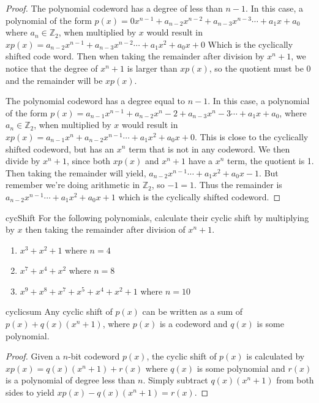 \begin{proof}{}

The polynomial codeword has a degree of less than $n-1$. In this case, a polynomial of the form $p(x)= 0x^{n-1} + a_{n-2}x^{n-2} + a_{n-3}x^{n-3} \cdots + a_{1}x + a_0$ where $a_n \in \mathbb{Z}_2$, when multiplied by $x$ would result in $xp(x)=a_{n-2}x^{n-1} + a_{n-3}x^{n-2} \cdots + a_1x^2 + a_{0}x + 0$ Which is the cyclically shifted code word.  Then when taking the remainder after division by $x^n + 1$, we notice that the degree of $x^n + 1$ is larger than $xp(x)$, so the quotient must be 0 and the remainder will be $xp(x)$.

 
The polynomial codeword has a degree equal to $n-1$.  In this case, a polynomial of the form $p(x)= a_{n-1}x^{n-1} + a_{n-2}x^n-2 + a_{n-3}x^n-3 \cdots + a_{1}x + a_0$, where $a_n \in \mathbb{Z}_2$, when multiplied by $x$ would result in $xp(x)=a_{n-1}x^n + a_{n-2}x^{n-1} \cdots + a_1x^2 + a_{0}x + 0$.  This is close to the cyclically shifted codeword, but has an $x^n$ term that is not in any codeword.  We then divide by $x^n + 1$, since both $xp(x)$ and $x^n + 1$ have a $x^n$ term, the quotient is 1.  Then taking the remainder will yield, $a_{n-2}x^{n-1} \cdots + a_1x^2 + a_{0}x - 1$.  But remember we're doing arithmetic in $\mathbb{Z}_2$, so $-1 = 1$.  Thus the remainder is $a_{n-2}x^{n-1} \cdots + a_1x^2 + a_{0}x + 1$ which is the cyclically shifted codeword.
\end{proof}

\begin{exercise} {cycShift}
For the following polynomials, calculate their cyclic shift by multiplying by $x$ then taking the remainder after division of $x^n + 1$.
\begin{enumerate}[a]
\item
$x^3 + x^2 + 1$ where $n=4$
\item
$x^7 + x^4 + x^2$ where $n=8$
\item
$x^9 + x^8 + x^7 + x^5 + x^4 +x^2 + 1$ where $n=10$
\end {enumerate}
\end {exercise}

\begin{prop}{cyclicsum}
Any cyclic shift of $p(x)$ can be written as a sum of $p(x) + q(x)(x^n + 1)$, where $p(x)$ is a codeword and $q(x)$ is some polynomial.  
\end {prop}

\begin{proof}
Given a $n$-bit codeword $p(x)$, the cyclic shift of $p(x)$ is calculated by $xp(x) = q(x)(x^n + 1) + r(x)$ where $q(x)$ is some polynomial and $r(x)$ is a polynomial of degree less than $n$.  Simply subtract $q(x)(x^n + 1)$ from both sides to yield $xp(x) - q(x)(x^n + 1) = r(x)$.
\end {proof}

